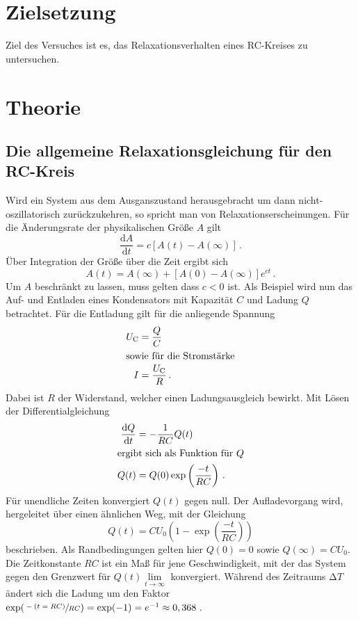 \section{Zielsetzung}
Ziel des Versuches ist es, das Relaxationsverhalten eines RC-Kreises zu untersuchen.

\section{Theorie}
\label{sec:Theorie}
\subsection{Die allgemeine Relaxationsgleichung für den RC-Kreis}
Wird ein System aus dem Ausganszustand herausgebracht um dann 
nicht-oszillatorisch zurückzukehren, so spricht man von Relaxationserscheinungen.
Für die Änderungsrate der physikalischen Größe $A$ gilt 
\begin{equation*}
    \frac{\text{d}A}{\text{d}t}=c[A(t)-A(\infty)]\,.
\end{equation*}
Über Integration der Größe über die Zeit ergibt sich 
\begin{equation*}
    A(t)=A(\infty)+[A(0)-A(\infty)]e^{ct}\,.
\end{equation*}
Um $A$ beschränkt zu lassen, muss gelten dass $c<0$ ist.
Als Beispiel wird nun das Auf- und Entladen eines Kondensators
mit Kapazität $C$ und Ladung $Q$ betrachtet.
Für die Entladung gilt für die anliegende Spannung 
\begin{align*}
    U_\text{C}&=\frac{Q}{C}\\
    \intertext{sowie für die Stromstärke}
    I&=\frac{U_\text{C}}{R}\,.
\end{align*}
Dabei ist $R$ der Widerstand, welcher einen Ladungsausgleich bewirkt.
Mit Lösen der Differentialgleichung 
\begin{align*}
    \frac{\text{d}Q}{\text{d}t}&=-\frac{1}{RC}Q(t)\\
    \intertext{ergibt sich als Funktion für $Q$}
    Q(t)&=Q(0)\exp\left(\frac{-t}{RC}\right)\,.
\end{align*}
Für unendliche Zeiten konvergiert $Q(t)$ gegen null.
Der Aufladevorgang wird, hergeleitet über einen ähnlichen Weg,
mit der Gleichung 
\begin{equation*}
    Q(t)=CU_0(1-\exp\left(\frac{-t}{RC}\right))
\end{equation*}
beschrieben.
Als Randbedingungen gelten hier $Q(0)=0$ sowie $Q(\infty)=CU_0$.
Die Zeitkonstante $RC$ ist ein Maß für jene Geschwindigkeit, mit der 
das System gegen den Grenzwert für $Q(t)\lim\limits_{t\to\infty}$
konvergiert. Während des Zeitraums $\increment T$ ändert sich die Ladung um 
den Faktor $\exp(\sfrac{-(t=RC)}{RC})=\exp(-1)=e^{-1}\approx0,368$\,. 
